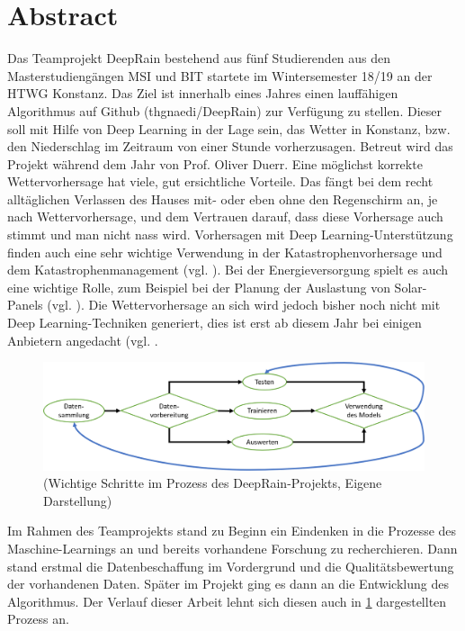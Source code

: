 
\section{Abstract}
Das Teamprojekt DeepRain bestehend aus fünf Studierenden aus den Masterstudiengängen MSI und BIT startete im Wintersemester 18/19 an der HTWG Konstanz. Das Ziel ist innerhalb eines Jahres einen lauffähigen Algorithmus auf Github (thgnaedi/DeepRain) zur Verfügung zu stellen. Dieser soll mit Hilfe von Deep Learning in der Lage sein, das Wetter in Konstanz, bzw. den Niederschlag im Zeitraum von einer Stunde vorherzusagen. Betreut wird das Projekt während dem Jahr von Prof. Oliver Duerr. 
Eine möglichst korrekte Wettervorhersage hat viele, gut ersichtliche Vorteile. Das fängt bei dem recht alltäglichen Verlassen des Hauses mit- oder eben ohne den Regenschirm an, je nach Wettervorhersage, und dem Vertrauen darauf, dass diese Vorhersage auch stimmt und man nicht nass wird. Vorhersagen mit Deep Learning-Unterstützung finden auch eine sehr wichtige Verwendung in der Katastrophenvorhersage und dem Katastrophenmanagement (vgl. \cite[S. 763]{Hanif.2019}). Bei der Energieversorgung spielt es auch eine wichtige Rolle, zum Beispiel bei der Planung der Auslastung von Solar-Panels (vgl. \cite[S. 2]{AndreGensleret.al..}). Die Wettervorhersage an sich wird jedoch bisher noch nicht mit Deep Learning-Techniken generiert, dies ist erst ab diesem Jahr bei einigen Anbietern angedacht (vgl. \cite{ChristophFrohlich.2019}. 
\begin{figure}[ht]
\centering
\includegraphics[width=\linewidth]{pics/Deep_learning_prozess}
\caption{(Wichtige Schritte im Prozess des DeepRain-Projekts, Eigene Darstellung)}
\label{fig:deepLearningProcess}
\end{figure}
Im Rahmen des Teamprojekts stand zu Beginn ein Eindenken in die Prozesse des Maschine-Learnings an und bereits vorhandene Forschung zu recherchieren. Dann stand erstmal die Datenbeschaffung im Vordergrund und die Qualitätsbewertung der vorhandenen Daten. Später im Projekt ging es dann an die Entwicklung des Algorithmus. Der Verlauf dieser Arbeit lehnt sich diesen auch in \ref{fig:deepLearningProcess} dargestellten Prozess an. 

